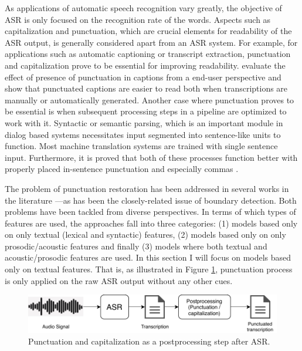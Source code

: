 As applications of automatic speech recognition vary greatly, the objective of ASR is only focused on the recognition rate of the words. Aspects such as capitalization and punctuation, which are crucial elements for readability of the ASR output, is generally considered apart from an ASR system. For example, for applications such as automatic captioning or transcript extraction, punctuation and capitalization prove to be essential for improving readability. \cite{Tundik2018} evaluate the effect of presence of punctuation in captions from a end-user perspective and show that punctuated captions are easier to read both when transcriptions are manually or automatically generated. Another case where punctuation proves to be essential is when subsequent processing steps in a pipeline are optimized to work with it. Syntactic or semantic parsing, which is an important module in dialog based systems necessitates input segmented into sentence-like units to function. Most machine translation systems are trained with single sentence input. Furthermore, it is proved that both of these processes function better with properly placed in-sentence punctuation and especially commas \citep{10045_76089, Jones:1994:ERP:991886.991960}. 

The problem of punctuation restoration has been addressed in several works in the literature ---as has been the closely-related issue of boundary detection. Both problems have been tackled from diverse perspectives. In terms of which types of features are used, the approaches fall into three categories: (1) models based only on only textual (lexical and syntactic) features, (2) models based only on only prosodic/acoustic features and finally (3) models where both textual and acoustic/prosodic features are used. In this section I will focus on models based only on textual features. That is, as illustrated in Figure \ref{sota:figure:punc_on_text}, punctuation process is only applied on the raw ASR output without any other cues. 

\begin{figure}[t]
  \centering
  \includegraphics[width=\linewidth]{img/Punctuation_on_ASR_output.pdf}
  \caption{Punctuation and capitalization as a postprocessing step after ASR.}
  \label{sota:figure:punc_on_text}
\end{figure}

